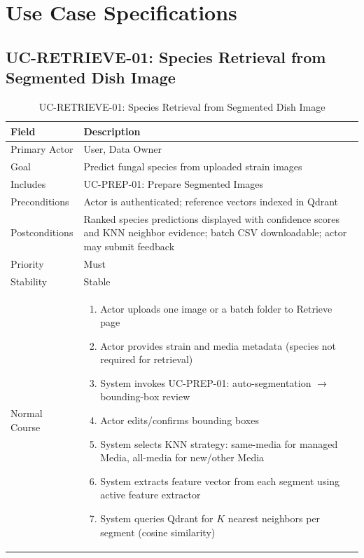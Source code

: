 
\section{Use Case Specifications}

\subsection{UC-RETRIEVE-01: Species Retrieval from Segmented Dish Image}

\begin{table}[H]
\centering
\caption{UC-RETRIEVE-01: Species Retrieval from Segmented Dish Image}
\label{tab:uc_retrieve}
\small
\begin{tabularx}{\textwidth}{@{}p{3cm} X@{}}
\toprule
\textbf{Field} & \textbf{Description} \\
\midrule
Primary Actor & User, Data Owner \\
Goal & Predict fungal species from uploaded strain images \\
Includes & UC-PREP-01: Prepare Segmented Images \\
Preconditions & Actor is authenticated; reference vectors indexed in Qdrant \\
Postconditions & Ranked species predictions displayed with confidence scores and KNN neighbor evidence; batch CSV downloadable; actor may submit feedback \\
Priority & Must \\
Stability & Stable \\
Normal Course &
\begin{enumerate}[nosep]
  \item Actor uploads one image or a batch folder to Retrieve page
  \item Actor provides strain and media metadata (species not required for retrieval)
  \item System invokes UC-PREP-01: auto-segmentation $\rightarrow$ bounding-box review
  \item Actor edits/confirms bounding boxes
  \item System selects KNN strategy: same-media for managed Media, all-media for new/other Media
  \item System extracts feature vector from each segment using active feature extractor
  \item System queries Qdrant for $K$ nearest neighbors per segment (cosine similarity)

\end{enumerate}
\end{tabularx}
\end{table}
